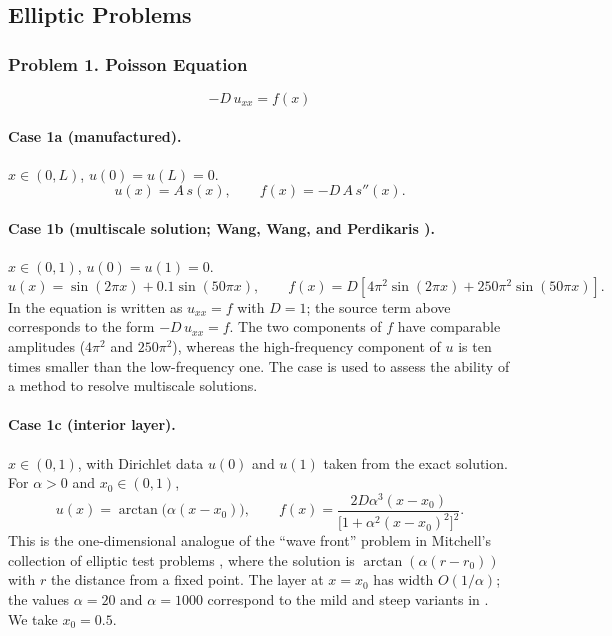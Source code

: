 \documentclass[11pt]{article}
\begin{document}
\subsection{Elliptic Problems}

\subsubsection*{Problem 1. Poisson Equation}

\[
\boxed{-D\,u_{xx}=f(x)}
\]

\paragraph{Case 1a (manufactured).}
$x\in(0,L)$, $u(0)=u(L)=0$.
\[
u(x)=A\,s(x),
\qquad
f(x)=-D\,A\,s''(x).
\]

\paragraph{Case 1b (multiscale solution; Wang, Wang, and Perdikaris \cite{WWP21}).}
$x\in(0,1)$, $u(0)=u(1)=0$.
\[
u(x)=\sin(2\pi x)+0.1\sin(50\pi x),
\qquad
f(x)=D\left[4\pi^2\sin(2\pi x)+250\pi^2\sin(50\pi x)\right].
\]
In \cite{WWP21} the equation is written as $u_{xx}=f$ with $D=1$; the
source term above corresponds to the form $-D\,u_{xx}=f$. The two
components of $f$ have comparable amplitudes ($4\pi^2$ and $250\pi^2$),
whereas the high-frequency component of $u$ is ten times smaller than
the low-frequency one. The case is used to assess the ability of a
method to resolve multiscale solutions.

\paragraph{Case 1c (interior layer).}
$x\in(0,1)$, with Dirichlet data $u(0)$ and $u(1)$ taken from the exact
solution. For $\alpha>0$ and $x_0\in(0,1)$,
\[
u(x)=\arctan\bigl(\alpha(x-x_0)\bigr),
\qquad
f(x)=\frac{2D\alpha^3(x-x_0)}{\bigl[1+\alpha^2(x-x_0)^2\bigr]^2}.
\]
This is the one-dimensional analogue of the ``wave front'' problem in
Mitchell's collection of elliptic test problems \cite{Mit13}, where the
solution is $\arctan(\alpha(r-r_0))$ with $r$ the distance from a fixed
point. The layer at $x=x_0$ has width $O(1/\alpha)$; the values
$\alpha=20$ and $\alpha=1000$ correspond to the mild and steep variants
in \cite{Mit13}. We take $x_0=0.5$.
\end{document}
